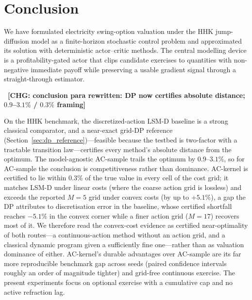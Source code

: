 \documentclass[a4paper,fleqn]{cas-dc}
\newcommand{\hlblock}[1]{\par\noindent
    \colorbox{chgyellow}{\parbox{\dimexpr\linewidth-2\fboxsep\relax}{#1}}\par}
\newcommand{\hlblock}[1]{#1}
\newcommand{\chg}[1]{{\normalfont\bfseries\color{red}~[CHG: \textsf{\footnotesize #1}]~}}
\newcommand{\chg}[1]{}
\begin{document}
\section{Conclusion}
\label{sec:conclusion}

We have formulated electricity swing-option valuation under the HHK jump-diffusion model as a finite-horizon stochastic control problem and approximated its solution with deterministic actor--critic methods. The central modelling device is a profitability-gated actor that clips candidate exercises to quantities with non-negative immediate payoff while preserving a usable gradient signal through a straight-through estimator.

\chg{conclusion para rewritten: DP now certifies absolute distance; $0.9$--$3.1\%$ / $0.3\%$ framing}%
\hlblock{On the HHK benchmark, the discretized-action LSM-D baseline is a strong classical comparator, and a near-exact grid-DP reference (Section~\ref{sec:dp_reference})---feasible because the testbed is two-factor with a tractable transition law---certifies every method's absolute distance from the optimum. The model-agnostic AC-sample trails the optimum by $0.9$--$3.1\%$, so for AC-sample the conclusion is competitiveness rather than dominance. AC-kernel is certified to lie within $0.3\%$ of the true value in every cell of the cost grid; it matches LSM-D under linear costs (where the coarse action grid is lossless) and exceeds the reported $M=5$ grid under convex costs (by up to $+5.1\%$), a gap the DP attributes to discretisation error in the baseline, whose certified shortfall reaches $-5.1\%$ in the convex corner while a finer action grid ($M=17$) recovers most of it. We therefore read the convex-cost evidence as certified near-optimality of both routes---a continuous-action method without an action grid, and a classical dynamic program given a sufficiently fine one---rather than as valuation dominance of either. AC-kernel's durable advantages over AC-sample are its far more reproducible benchmark gap across seeds (paired confidence intervals roughly an order of magnitude tighter) and grid-free continuous exercise. The present experiments focus on optional exercise with a cumulative cap and no active refraction lag.}
\end{document}
